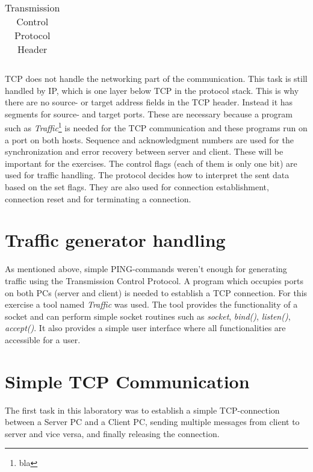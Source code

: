 \begin{table}[H]
\begin{tabular}{|c|c|c|c|c|c|c|c|c|c|c|c|c|}
	\end{tabular}
	\caption{Transmission Control Protocol Header}
\end{table}

TCP does not handle the networking part of the communication. This task is still handled by IP, which is one layer below TCP in the protocol stack. This is why there are no source- or target address fields in the TCP header. Instead it has segments for source- and target ports. These are necessary because a program such as \textit{Traffic}\footnote{bla} is needed for the TCP communication and these programs run on a port on both hosts. Sequence and acknowledgment numbers are used for the synchronization and error recovery between server and client. These will be important for the exercises. The control flags (each of them is only one bit) are used for traffic handling. The protocol decides how to interpret the sent data based on the set flags. They are also used for connection establishment, connection reset and for terminating a connection.

\section{Traffic generator handling}
As mentioned above, simple PING-commands weren't enough for generating traffic using the Transmission Control Protocol. A program which occupies ports on both PCs (server and client) is needed to establish a TCP connection. For this exercise a tool named \textit{Traffic} was used. The tool provides the functionality of a socket and can perform simple socket routines such as \textit{socket}, \textit{bind()}, \textit{listen()}, \textit{accept()}. It also provides a simple user interface where all functionalities are accessible for a user.

\section{Simple TCP Communication}
The first task in this laboratory was to establish a simple TCP-connection between a Server PC and a Client PC, sending multiple messages from client to server and vice versa, and finally releasing the connection.

